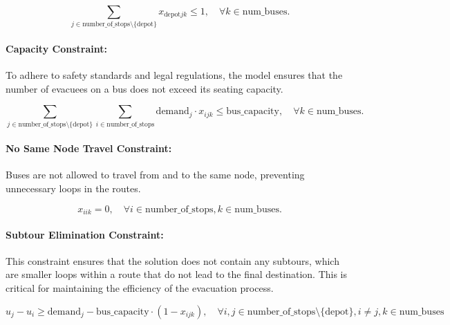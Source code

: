 \documentclass[12pt]{article}
\begin{document}
\[
\sum_{j \in \text{number\_of\_stops} \setminus \{ \text{depot} \}} x_{\text{depot}jk} \leq 1, \quad \forall k \in \text{num\_buses}.
\]

\paragraph{Capacity Constraint:} To adhere to safety standards and legal regulations, the model ensures that the number of evacuees on a bus does not exceed its seating capacity.

\[
\sum_{j \in \text{number\_of\_stops} \setminus \{ \text{depot} \}} \sum_{i \in \text{number\_of\_stops}} \text{demand}_j \cdot x_{ijk} \leq \text{bus\_capacity}, \quad \forall k \in \text{num\_buses}.
\]

\paragraph{No Same Node Travel Constraint:} Buses are not allowed to travel from and to the same node, preventing unnecessary loops in the routes.

\[
x_{iik} = 0, \quad \forall i \in \text{number\_of\_stops}, k \in \text{num\_buses}.
\]

\paragraph{Subtour Elimination Constraint:} This constraint ensures that the solution does not contain any subtours, which are smaller loops within a route that do not lead to the final destination. This is critical for maintaining the efficiency of the evacuation process.

\begin{equation*}
u_j - u_i \geq \text{demand}_j - \text{bus\_capacity} \cdot (1 - x_{ijk}), \quad \forall i, j \in \text{number\_of\_stops} \setminus \{ \text{depot} \}, i \neq j, k \in \text{num\_buses}
\end{equation*}
\end{document}
